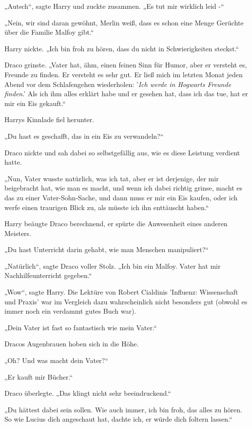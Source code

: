 {„Autsch“, sagte Harry und zuckte zusammen. „Es tut mir wirklich leid -“

„Nein, wir sind daran gewöhnt, Merlin weiß, dass es schon eine Menge Gerüchte über die Familie Malfoy gibt.“

Harry nickte. „Ich bin froh zu hören, dass du nicht in Schwierigkeiten steckst.“

Draco grinste. „Vater hat, ähm, einen feinen Sinn für Humor, aber er versteht es, Freunde zu finden. Er versteht es sehr gut. Er ließ mich im letzten Monat jeden Abend vor dem Schlafengehen wiederholen: '\emph{Ich werde in Hogwarts Freunde finden}.' Als ich ihm alles erklärt habe und er gesehen hat, dass ich das tue, hat er mir ein Eis gekauft.“

Harrys Kinnlade fiel herunter.

„Du hast es geschafft, das in ein Eis zu verwandeln?“

Draco nickte und sah dabei so selbstgefällig aus, wie es diese Leistung verdient hatte.

„Nun, Vater wusste natürlich, was ich tat, aber er ist derjenige, der mir beigebracht hat, wie man es macht, und wenn ich dabei richtig grinse, macht es das zu einer Vater-Sohn-Sache, und dann muss er mir ein Eis kaufen, oder ich werfe einen traurigen Blick zu, als müsste ich ihn enttäuscht haben.“

Harry beäugte Draco berechnend, er spürte die Anwesenheit eines anderen Meisters.

„Du hast Unterricht darin gehabt, wie man Menschen manipuliert?“

„Natürlich“, sagte Draco voller Stolz. „Ich bin ein Malfoy. Vater hat mir Nachhilfeunterricht gegeben.“

„Wow“, sagte Harry. Die Lektüre von Robert Cialdinis 'Influenz: Wissenschaft und Praxis' war im Vergleich dazu wahrscheinlich nicht besonders gut (obwohl es immer noch ein verdammt gutes Buch war).

„Dein Vater ist fast so fantastisch wie mein Vater.“

Dracos Augenbrauen hoben sich in die Höhe.

„Oh? Und was macht dein Vater?“

„Er kauft mir Bücher.“

Draco überlegte. „Das klingt nicht sehr beeindruckend.“

„Du hättest dabei sein sollen. Wie auch immer, ich bin froh, das alles zu hören. So wie Lucius dich angeschaut hat, dachte ich, er würde dich foltern lassen.“

}
